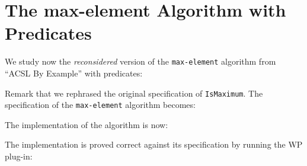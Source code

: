 \section{The \textsf{max-element} Algorithm with Predicates}
\label{max-element-pred}

We study now the \emph{reconsidered} version of the \texttt{max-element}
algorithm from ``ACSL By Example'' with predicates:


Remark that we rephrased the original specification of \texttt{IsMaximum}.
The specification of the \texttt{max-element} algorithm 
becomes:


The implementation of the algorithm is now:


The implementation is proved correct against its specification by
running the \textsf{WP} plug-in:

